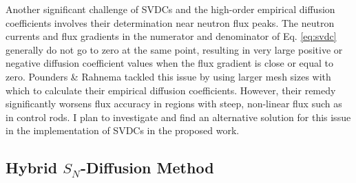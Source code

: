 Another significant challenge of \glspl{SVDC} and the high-order empirical diffusion coefficients
involves their determination near neutron flux peaks. The neutron currents and
flux gradients in the numerator and denominator of Eq. \ref{eq:svdc} generally do not go to zero at
the same point, resulting in very large positive or negative diffusion coefficient values when the
flux gradient is close or equal to zero. Pounders \& Rahnema tackled this issue by using
larger mesh sizes with which to calculate their empirical diffusion coefficients. However, their
remedy significantly worsens flux accuracy in regions with steep, non-linear flux such as in
control rods. I plan to investigate and find an alternative solution for this issue in the
implementation of \glspl{SVDC} in the proposed work.

\subsection{Hybrid $S_N$-Diffusion Method} \label{sec:hybrid-method}

